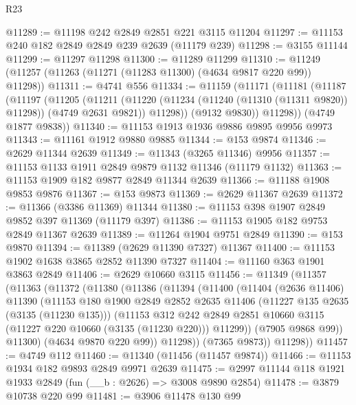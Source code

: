 \begin{lexlean}{R23}
\begin{coremodule}
@11289 := @11198 @242 @2849 @2851 @221 @3115 @11204
@11297 := @11153 @240 @182 @2849 @2849 @239 @2639 (@11179 @239)
@11298 := @3155 @11144
@11299 := @11297 @11298
@11300 := @11289 @11299
@11310 := @11249 (@11257 (@11263 (@11271 (@11283 @11300) (@4634 @9817 @220 @99)) @11298))
@11311 := @4741 @556
@11334 := @11159
    (@11171
      (@11181
        (@11187
          (@11197
            (@11205
              (@11211
                (@11220 (@11234 (@11240 (@11310 (@11311 @9820)) @11298)) (@4749 @2631 @9821))
                @11298))
            (@9132 @9830))
          @11298))
      (@4749 @1877 @9838))
@11340 := @11153 @1913 @1936 @9886 @9895 @9956 @9973
@11343 := @11161 @1912 @9880 @9885
@11344 := @153 @9874
@11346 := @2629 @11344 @2639
@11349 := @11343 (@3265 @11346) @9956
@11357 := @11153 @1133 @1911 @2849 @9879 @1132 @11346 (@11179 @1132)
@11363 := @11153 @1909 @182 @9877 @2849 @11344 @2639
@11366 := @11188 @1908 @9853 @9876
@11367 := @153 @9873
@11369 := @2629 @11367 @2639
@11372 := @11366 (@3386 @11369) @11344
@11380 := @11153 @398 @1907 @2849 @9852 @397 @11369 (@11179 @397)
@11386 := @11153 @1905 @182 @9753 @2849 @11367 @2639
@11389 := @11264 @1904 @9751 @2849
@11390 := @153 @9870
@11394 := @11389 (@2629 @11390 @7327) @11367
@11400 := @11153 @1902 @1638 @3865 @2852 @11390 @7327
@11404 := @11160 @363 @1901 @3863 @2849
@11406 := @2629 @10660 @3115
@11456 := @11349
    (@11357
      (@11363
        (@11372
          (@11380
            (@11386
              (@11394
                (@11400
                  (@11404
                    (@2636 @11406)
                    @11390
                    (@11153
                      @180
                      @1900
                      @2849
                      @2852
                      @2635
                      @11406
                      (@11227 @135 @2635 (@3135 (@11230 @135)))
                      (@11153
                        @312
                        @242
                        @2849
                        @2851
                        @10660
                        @3115
                        (@11227 @220 @10660 (@3135 (@11230 @220)))
                        @11299))
                    (@7905 @9868 @99))
                  @11300)
                (@4634 @9870 @220 @99))
              @11298))
          (@7365 @9873))
        @11298))
@11457 := @4749 @112
@11460 := @11340 (@11456 (@11457 @9874))
@11466 := @11153 @1934 @182 @9893 @2849 @9971 @2639
@11475 := @2997 @11144 @118 @1921 @1933 @2849 (fun (__b : @2626) => @3008 @9890 @2854)
@11478 := @3879 @10738 @220 @99
@11481 := @3906 @11478 @130 @99

\end{coremodule}
\end{lexlean}
